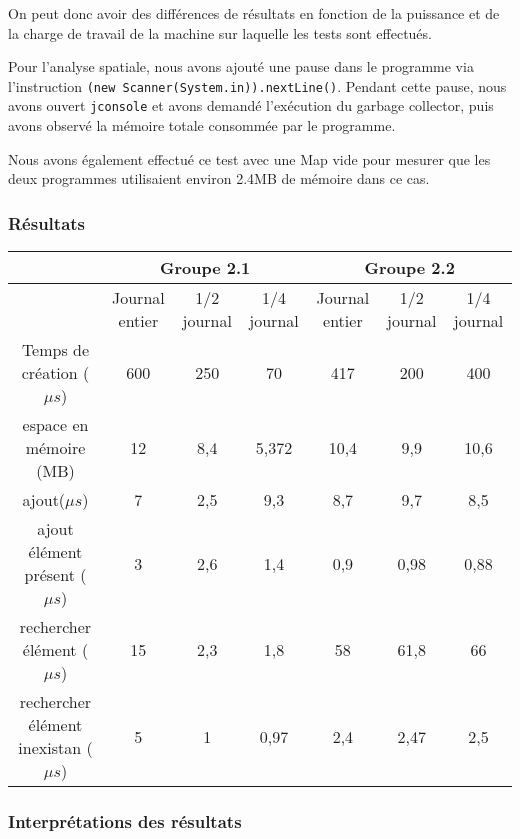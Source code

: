 \documentclass[a4paper,10pt]{article}
\begin{document}
	On peut donc avoir des différences de résultats en fonction de la puissance et de la charge de travail de la machine sur laquelle les tests sont effectués.
	
	Pour l'analyse spatiale, nous avons ajouté une pause dans le programme via l'instruction \texttt{(new Scanner(System.in)).nextLine()}. Pendant cette pause, nous avons ouvert \texttt{jconsole} et avons demandé l'exécution du garbage collector, puis avons observé la mémoire totale consommée par le programme.

	Nous avons également effectué ce test avec une Map vide pour mesurer que les deux programmes utilisaient environ 2.4MB de mémoire dans ce cas.

 

\subsubsection{Résultats}

\begin{center}

\begin{tabular}{|c|c|c|c|c|c|c|}
   \hline 
    & \multicolumn{3}{c|}{{\tiny Groupe 2.1}} &\multicolumn{3}{c|}{{\tiny Groupe 2.2}} \\ 
   \hline 
    &{\tiny  Journal entier} &{\tiny  1/2 journal }& {\tiny 1/4 journal} &{\tiny  Journal entier} & {\tiny 1/2 journal }&{\tiny  1/4 journal} \\ 
   \hline 
  {\tiny  Temps de création ($\mu s$)} & 600 & 250 & 70 & 417 & 200 & 400 \\ 
   \hline 
   {\tiny espace en mémoire (MB)} & 12  & 8,4  & 5,372  & 10,4  & 9,9  & 10,6  \\ 
   \hline 
   {\tiny ajout($\mu s$)}& 7 & 2,5 & 9,3 & 8,7 & 9,7 & 8,5 \\ 
   \hline 
   {\tiny ajout élément présent ($\mu s$)} & 3 & 2,6 & 1,4 & 0,9 & 0,98 & 0,88 \\ 
   \hline 
  {\tiny  rechercher élément ($\mu s$)} & 15 & 2,3 & 1,8 & 58 & 61,8 & 66 \\ 
   \hline 
  {\tiny  rechercher élément inexistan ($\mu s$)} & 5 & 1 & 0,97 & 2,4 & 2,47 & 2,5 \\ 
   \hline 
   \end{tabular}   
     
\end{center} 

\subsubsection{Interprétations des résultats}
\end{document}
